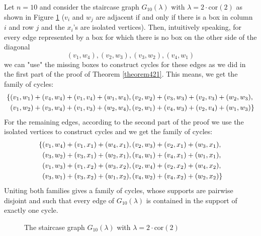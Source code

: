 \begin{expl}

Let \(n=10\) and consider the staircase graph \(G_{10}(\lambda)\) with \(\lambda=2\cdot\text{cor}(2)\) as shown in Figure \ref{figure13:Figure 13} (\(v_i\) and \(w_j\) are adjacent if and only if there is a box in column \(i\) and row \(j\) and the \(x_i\)'s are isolated vertices). Then, intuitively speaking, for every edge represented by a box for which there is no box on the other side of the diagonal
\[
(v_1,w_4),(v_2,w_3),(v_3,w_2),(v_4,w_1)
\]
we can "use" the missing boxes to construct cycles for these edges as we did in the first part of the proof of Theorem \ref{theorem421}. This means, we get the family of cycles:
\begin{align}
\{&(v_1,w_1)+(v_4,w_4)+(v_1,v_4)+(w_1,w_4),(v_2,w_2)+(v_3,w_3)+(v_2,v_3)+(w_2,w_3),\notag\\
&(v_1,w_2)+(v_3,w_4)+(v_1,v_3)+(w_2,w_4),(v_2,w_1)+(v_4,w_3)+(v_2,v_4)+(w_1,w_3)\}\notag
\end{align}
For the remaining edges, according to the second part of the proof we use the isolated vertices to construct cycles and we get the family of cycles:
\begin{align}
\{&(v_1,w_4)+(v_1,x_1)+(w_4,x_1),(v_2,w_3)+(v_2,x_1)+(w_3,x_1),\notag\\
&(v_3,w_2)+(v_3,x_1)+(w_2,x_1),(v_4,w_1)+(v_4,x_1)+(w_1,x_1),\notag\\
&(v_1,w_3)+(v_1,x_2)+(w_3,x_2),(v_2,w_4)+(v_2,x_2)+(w_4,x_2),\notag\\
&(v_3,w_1)+(v_3,x_2)+(w_1,x_2),(v_4,w_2)+(v_4,x_2)+(w_2,x_2)\}\notag
\end{align}
Uniting both families gives a family of cycles, whose supports are pairwise disjoint and such that every edge of \(G_{10}(\lambda)\) is contained in the support of exactly one cycle.

\begin{figure}[ht]
\centering
{}
  \caption{The staircase graph $G_{10}(\lambda)$ with $\lambda=2\cdot\text{cor}(2)$}
  \label{figure13:Figure 13}
\end{figure}

\end{expl}


